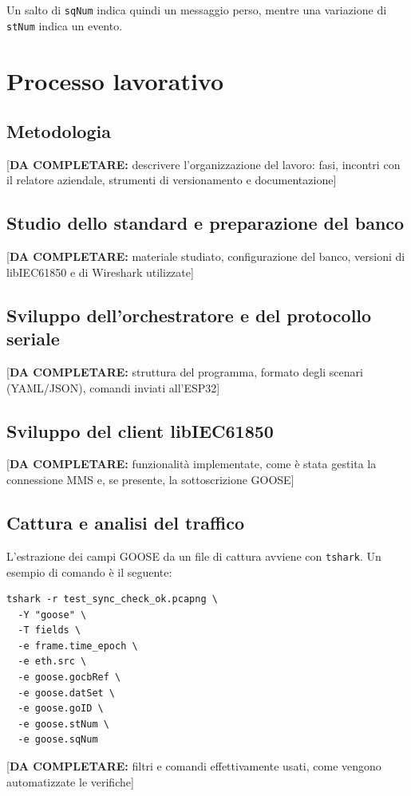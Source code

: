 \documentclass[11pt,a4paper,italian,oneside,openany]{book}
\newcommand{\daf}[1]{{\color{red}[\textbf{DA COMPLETARE:} #1]}}
\begin{document}
Un salto di \texttt{sqNum} indica quindi un messaggio perso, mentre una variazione di \texttt{stNum} indica un evento.

\chapter{Processo lavorativo}\label{cap:processo}
\section{Metodologia}
\daf{descrivere l'organizzazione del lavoro: fasi, incontri con il relatore aziendale, strumenti di versionamento e documentazione}

\section{Studio dello standard e preparazione del banco}
\daf{materiale studiato, configurazione del banco, versioni di libIEC61850 e di Wireshark utilizzate}

\section{Sviluppo dell'orchestratore e del protocollo seriale}
\daf{struttura del programma, formato degli scenari (YAML/JSON), comandi inviati all'ESP32}

\section{Sviluppo del client libIEC61850}
\daf{funzionalità implementate, come è stata gestita la connessione MMS e, se presente, la sottoscrizione GOOSE}

\section{Cattura e analisi del traffico}
L'estrazione dei campi GOOSE da un file di cattura avviene con \texttt{tshark}. Un esempio di comando è il seguente:
\begin{lstlisting}
tshark -r test_sync_check_ok.pcapng \
  -Y "goose" \
  -T fields \
  -e frame.time_epoch \
  -e eth.src \
  -e goose.gocbRef \
  -e goose.datSet \
  -e goose.goID \
  -e goose.stNum \
  -e goose.sqNum
\end{lstlisting}
\daf{filtri e comandi effettivamente usati, come vengono automatizzate le verifiche}
\end{document}
